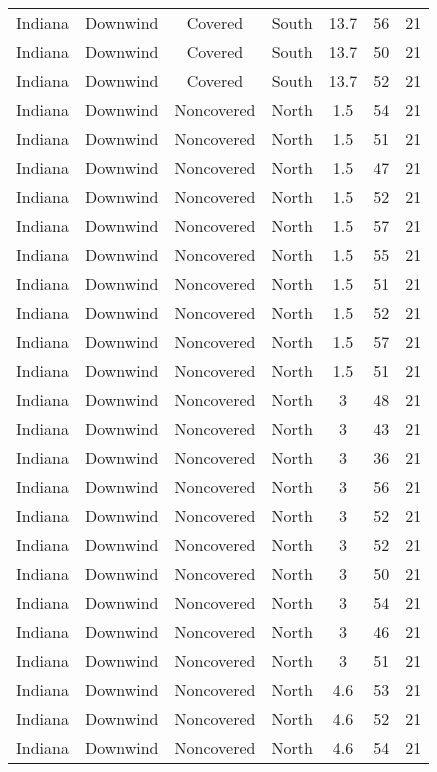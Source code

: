 \documentclass{article}
\begin{document}
\begin{longtable}[H]{ccccccc}
Indiana & Downwind & Covered     & South  & 13.7 & 56 & 21 \\
Indiana & Downwind & Covered     & South  & 13.7 & 50 & 21 \\
Indiana & Downwind & Covered     & South  & 13.7 & 52 & 21 \\
Indiana & Downwind & Noncovered & North  & 1.5  & 54 & 21 \\
Indiana & Downwind & Noncovered & North  & 1.5  & 51 & 21 \\
Indiana & Downwind & Noncovered & North  & 1.5  & 47 & 21 \\
Indiana & Downwind & Noncovered & North  & 1.5  & 52 & 21 \\
Indiana & Downwind & Noncovered & North  & 1.5  & 57 & 21 \\
Indiana & Downwind & Noncovered & North  & 1.5  & 55 & 21 \\
Indiana & Downwind & Noncovered & North  & 1.5  & 51 & 21 \\
Indiana & Downwind & Noncovered & North  & 1.5  & 52 & 21 \\
Indiana & Downwind & Noncovered & North  & 1.5  & 57 & 21 \\
Indiana & Downwind & Noncovered & North  & 1.5  & 51 & 21 \\
Indiana & Downwind & Noncovered & North  & 3    & 48 & 21 \\
Indiana & Downwind & Noncovered & North  & 3    & 43 & 21 \\
Indiana & Downwind & Noncovered & North  & 3    & 36 & 21 \\
Indiana & Downwind & Noncovered & North  & 3    & 56 & 21 \\
Indiana & Downwind & Noncovered & North  & 3    & 52 & 21 \\
Indiana & Downwind & Noncovered & North  & 3    & 52 & 21 \\
Indiana & Downwind & Noncovered & North  & 3    & 50 & 21 \\
Indiana & Downwind & Noncovered & North  & 3    & 54 & 21 \\
Indiana & Downwind & Noncovered & North  & 3    & 46 & 21 \\
Indiana & Downwind & Noncovered & North  & 3    & 51 & 21 \\
Indiana & Downwind & Noncovered & North  & 4.6  & 53 & 21 \\
Indiana & Downwind & Noncovered & North  & 4.6  & 52 & 21 \\
Indiana & Downwind & Noncovered & North  & 4.6  & 54 & 21 \\

\end{longtable}
\end{document}
